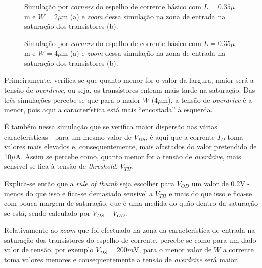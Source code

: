 \documentclass[11pt]{article}
\numberwithin{equation}{section}
\begin{document}
\begin{figure}[H]
	\centering
	\hspace*{-0.8cm}
	\hspace*{0.5cm}
	\vspace{-0.8em}
	\caption{Simulação por \textit{corners} do espelho de corrente básico com $L = 0.35\mu$m e $W = 2\mu$m (a) e \textit{zoom} dessa simulação na zona de entrada na saturação dos transístores (b).}
	\vspace{-0.8em}
\end{figure}

\begin{figure}[H]
	\centering
	\hspace*{-0.8cm}
	\hspace*{0.5cm}
	\vspace{-0.8em}
	\caption{Simulação por \textit{corners} do espelho de corrente básico com $L = 0.35\mu$m e $W = 4\mu$m (a) e \textit{zoom} dessa simulação na zona de entrada na saturação dos transístores (b).}
	\vspace{-0.8em}
\end{figure}

Primeiramente, verifica-se que quanto menor for o valor da largura, maior será a tensão de \textit{overdrive}, ou seja, os transístores entram mais tarde na saturação. Das três simulações percebe-se que para o maior $W$ (4$\mu$m), a tensão de \textit{overdrive} é a menor, pois aqui a característica está mais ``encostada'' à esquerda.

É também nessa simulação que se verifica maior dispersão nas várias características - para um mesmo valor de $V_{DS}$, é aqui que a corrente $I_{D}$ toma valores mais elevados e, consequentemente, mais afastados do valor pretendido de 10$\mu$A. Assim se percebe como, quanto menor for a tensão de \textit{overdrive}, mais sensível se fica à tensão de \textit{threshold}, $V_{TH}$.

Explica-se então que a \textit{rule of thumb} seja escolher para $V_{OD}$ um valor de 0.2V - menos do que isso e fica-se demasiado sensível a $V_{TH}$ e mais do que isso e fica-se com pouca margem de saturação, que é uma medida do quão dentro da saturação se está, sendo calculado por $V_{DS} - V_{OD}$.

Relativamente ao \textit{zoom} que foi efectuado na zona da característica de entrada na saturação dos transístores do espelho de corrente, percebe-se como para um dado valor de tensão, por exemplo $V_{DS} = 200m$V, para o menor valor de $W$ a corrente toma valores menores e consequentemente a tensão de \textit{overdrive} será maior.
\end{document}
